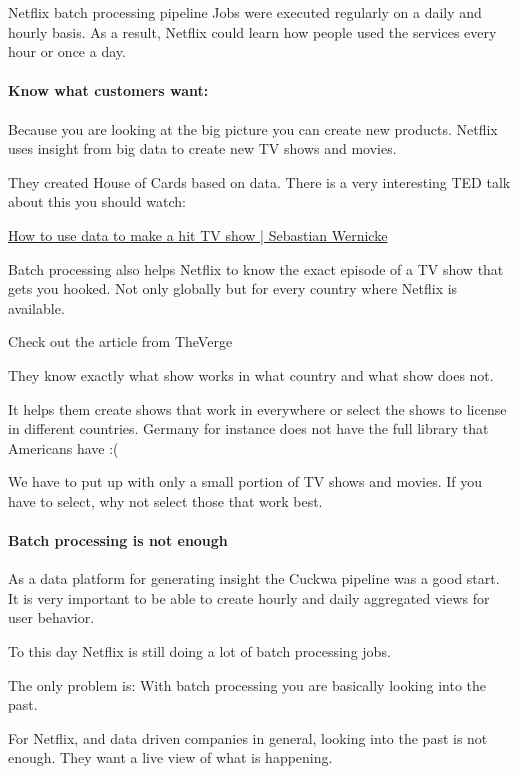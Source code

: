 \documentclass[12pt, numbers=noenddot]{scrreprt} %
\begin{document}
Netflix batch processing pipeline
Jobs were executed regularly on a daily and hourly basis. As a result, Netflix could learn how people used the services every hour or once a day.

\paragraph{Know what customers want:}

Because you are looking at the big picture you can create new products. Netflix uses insight from big data to create new TV shows and movies.

They created House of Cards based on data. There is a very interesting TED talk about this you should watch:

\href{https://www.youtube.com/watch?v=vQILP19qABk}{How to use data to make a hit TV show | Sebastian Wernicke}

Batch processing also helps Netflix to know the exact episode of a TV show that gets you hooked. Not only globally but for every country where Netflix is available.

Check out the article from TheVerge

They know exactly what show works in what country and what show does not.

It helps them create shows that work in everywhere or select the shows to license in different countries. Germany for instance does not have the full library that Americans have :(

We have to put up with only a small portion of TV shows and movies. If you have to select, why not select those that work best.

\paragraph{Batch processing is not enough}

As a data platform for generating insight the Cuckwa pipeline was a good start. It is very important to be able to create hourly and daily aggregated views for user behavior.

To this day Netflix is still doing a lot of batch processing jobs.

The only problem is: With batch processing you are basically looking into the past.

For Netflix, and data driven companies in general, looking into the past is not enough. They want a live view of what is happening.
\end{document}
